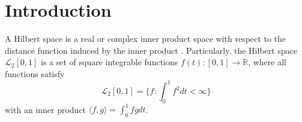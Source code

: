 

\section{Introduction}

%
%
%
%
%
%

A Hilbert space is a real or complex inner product space with respect to the distance function induced by the inner product \cite{dieudonne2013foundations}. Particularly, the Hilbert space $\mathcal{L}_2[0,1]$ is a set of square integrable functions $f(t):[0,1]\rightarrow\mathbb{R}$, where all functions satisfy 
\begin{equation*}
\mathcal{L}_2[0,1] =\lbrace f:\int_0^1f^2dt <\infty \rbrace
\end{equation*}
with an inner product $\langle f,g\rangle=\int_0^1fgdt$. 

